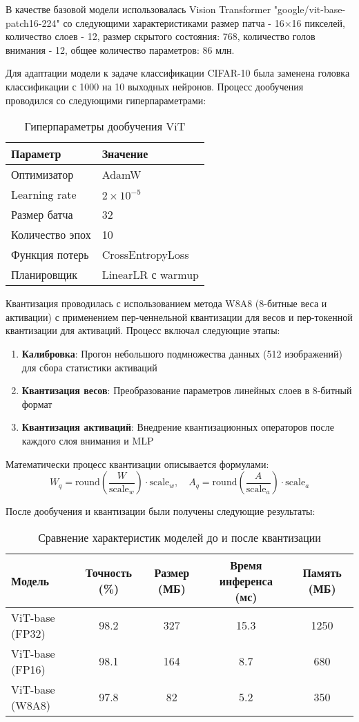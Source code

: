 \documentclass{article}
\begin{document}
В качестве базовой модели использовалась Vision Transformer "google/vit-base-patch16-224" со следующими характеристиками
размер патча - 16×16 пикселей, количество слоев - 12, размер скрытого состояния: 768, количество голов внимания - 12, общее количество параметров: 86 млн.

Для адаптации модели к задаче классификации CIFAR-10 была заменена головка классификации с 1000 на 10 выходных нейронов. Процесс дообучения проводился со следующими гиперпараметрами:
\begin{table}[h]
\centering
\caption{Гиперпараметры дообучения ViT}
\begin{tabular}{ll}
\toprule
\textbf{Параметр} & \textbf{Значение} \\
\midrule
Оптимизатор & AdamW \\
Learning rate & $2 \times 10^{-5}$ \\
Размер батча & 32 \\
Количество эпох & 10 \\
Функция потерь & CrossEntropyLoss \\
Планировщик & LinearLR с warmup \\
\bottomrule
\end{tabular}
\label{tab:hyperparams}
\end{table}


Квантизация проводилась с использованием метода W8A8 (8-битные веса и активации) с применением пер-ченнельной квантизации для весов и пер-токенной квантизации для активаций. Процесс включал следующие этапы:

\begin{enumerate}
    \item \textbf{Калибровка}: Прогон небольшого подмножества данных (512 изображений) для сбора статистики активаций
    \item \textbf{Квантизация весов}: Преобразование параметров линейных слоев в 8-битный формат
    \item \textbf{Квантизация активаций}: Внедрение квантизационных операторов после каждого слоя внимания и MLP
\end{enumerate}

Математически процесс квантизации описывается формулами:
$$
W_q = \text{round}\left(\frac{W}{\text{scale}_w}\right) \cdot \text{scale}_w, \quad
A_q = \text{round}\left(\frac{A}{\text{scale}_a}\right) \cdot \text{scale}_a
$$

После дообучения и квантизации были получены следующие результаты:

\begin{table}[h]
\centering
\caption{Сравнение характеристик моделей до и после квантизации}
\begin{tabular}{|l|c|c|c|c|}
\hline
Модель & Точность (\%) & Размер (МБ) & Время инференса (мс) & Память (МБ) \\
\hline
ViT-base (FP32) & 98.2 & 327 & 15.3 & 1250 \\
ViT-base (FP16) & 98.1 & 164 & 8.7 & 680 \\
ViT-base (W8A8) & 97.8 & 82 & 5.2 & 350 \\
\hline
\end{tabular}
\label{tab:results}
\end{table}
\end{document}

